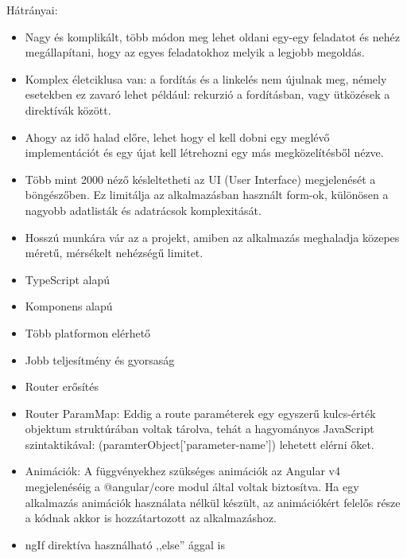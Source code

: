 Hátrányai: 

\begin{itemize}
\item Nagy és komplikált, több módon meg lehet oldani egy-egy feladatot és nehéz megállapítani, hogy az egyes feladatokhoz melyik a legjobb megoldás.
\item Komplex életciklusa van: a fordítás és a linkelés nem újulnak meg, némely esetekben ez zavaró lehet például: rekurzió a fordításban, vagy ütközések a direktívák között.
\item Ahogy az idő halad előre, lehet hogy el kell dobni egy meglévő implementációt és egy újat kell létrehozni egy más megközelítésből nézve.
\item Több mint 2000 néző késleltetheti az UI (User Interface) megjelenését a böngészőben. Ez limitálja az alkalmazásban használt form-ok, különösen a nagyobb adatlisták és adatrácsok komplexitását.
\item Hosszú munkára vár az a projekt, amiben az alkalmazás meghaladja közepes méretű, mérsékelt nehézségű limitet.
\end{itemize}


\begin{itemize}
\item TypeScript alapú
\item Komponens alapú
\item Több platformon elérhető
\item Jobb teljesítmény és gyorsaság
\item Router erősítés
\end{itemize}


\begin{itemize}
\item Router ParamMap: Eddig a route paraméterek egy egyszerű kulcs-érték objektum struktúrában voltak tárolva, tehát a hagyományos JavaScript szintaktikával: (paramterObject[’parameter-name’]) lehetett elérni őket. 
\item Animációk: A függvényekhez szükséges animációk az Angular v4 megjelenéséig a @angular/core modul által voltak biztosítva. Ha egy alkalmazás animációk használata nélkül készült, az animációkért felelős része a kódnak akkor is hozzátartozott az alkalmazáshoz.
\item ngIf direktíva használható ,,else'' ággal is
\end{itemize}

